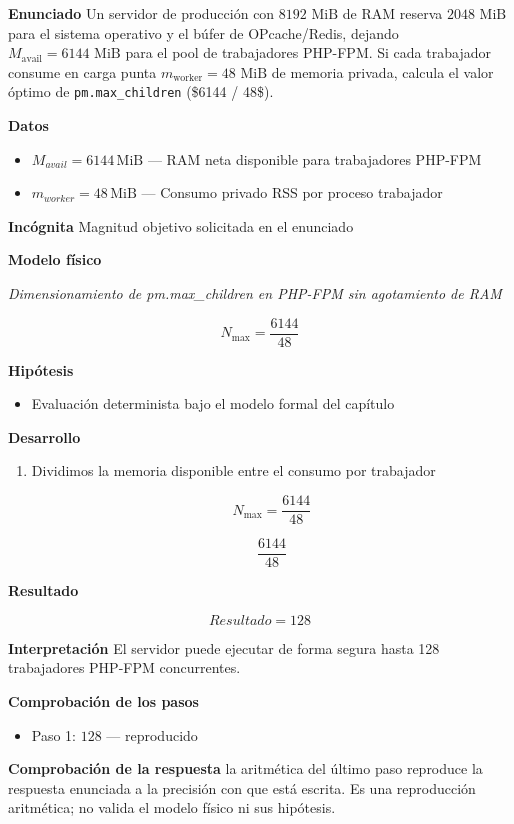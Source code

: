 \documentclass{book}
\begin{document}
\begin{tcolorbox}[title={Problema resuelto}, studiumworked, breakable]

\noindent\textbf{Enunciado}
Un servidor de producción con \(8192\text{ MiB}\) de RAM reserva \(2048\text{ MiB}\) para el sistema operativo y el búfer de OPcache/Redis, dejando \(M_{\text{avail}} = 6144\text{ MiB}\) para el pool de trabajadores PHP-FPM. Si cada trabajador consume en carga punta \(m_{\text{worker}} = 48\text{ MiB}\) de memoria privada, calcula el valor óptimo de \texttt{pm.max\_children} (\$6144 / 48\$).

\noindent\textbf{Datos}
\begin{itemize}
\item $M_{avail} = 6144\,\mathrm{MiB}$ — RAM neta disponible para trabajadores PHP-FPM
\item $m_{worker} = 48\,\mathrm{MiB}$ — Consumo privado RSS por proceso trabajador
\end{itemize}

\noindent\textbf{Incógnita}
Magnitud objetivo solicitada en el enunciado

\noindent\textbf{Modelo físico}

\noindent\textit{Dimensionamiento de pm.max\_children en PHP-FPM sin agotamiento de RAM}

\[
N_{\max} = \frac{6144}{48}
\]

\noindent\textbf{Hipótesis}
\begin{itemize}
\item Evaluación determinista bajo el modelo formal del capítulo
\end{itemize}

\noindent\textbf{Desarrollo}
\begin{enumerate}
\item
Dividimos la memoria disponible entre el consumo por trabajador

\[
N_{\max} = \frac{6144}{48}
\]

\[
\frac{6144}{48}
\]
\end{enumerate}

\noindent\textbf{Resultado}

\[
Resultado = 128
\]

\noindent\textbf{Interpretación}
El servidor puede ejecutar de forma segura hasta 128 trabajadores PHP-FPM concurrentes.

\noindent\textbf{Comprobación de los pasos}
\begin{itemize}
\item Paso 1: $128$ — reproducido
\end{itemize}

\noindent\textbf{Comprobación de la respuesta} la aritmética del último paso reproduce la respuesta enunciada a la precisión con que está escrita. Es una reproducción aritmética; no valida el modelo físico ni sus hipótesis.
\end{tcolorbox}
\end{document}
